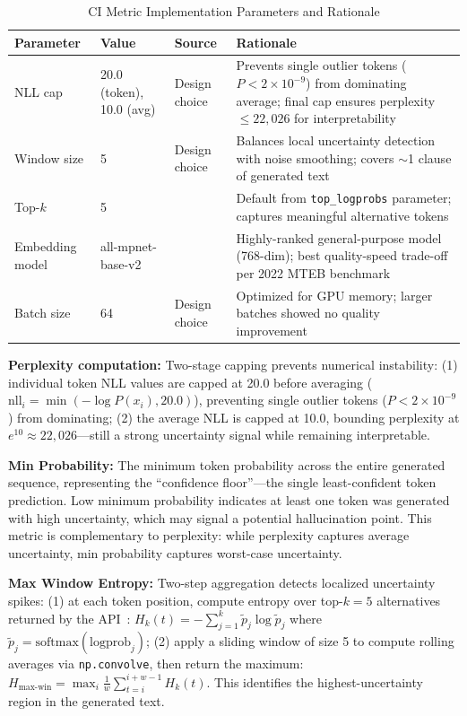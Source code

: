 \begin{table}[H]
\centering
\caption{CI Metric Implementation Parameters and Rationale}
\label{tab:ci_params}
\footnotesize
\begin{tabularx}{\textwidth}{@{}l l l X@{}}
\toprule
\textbf{Parameter} & \textbf{Value} & \textbf{Source} & \textbf{Rationale} \\
\midrule
NLL cap & 20.0 (token), 10.0 (avg) & Design choice & Prevents single outlier tokens ($P < 2 \times 10^{-9}$) from dominating average; final cap ensures perplexity $\leq 22{,}026$ for interpretability \\
Window size & 5 & Design choice & Balances local uncertainty detection with noise smoothing; covers $\sim$1 clause of generated text \\
Top-$k$ & 5 & \cite{openai2024api} & Default from \texttt{top\_logprobs} parameter; captures meaningful alternative tokens \\
Embedding model & all-mpnet-base-v2 & \cite{muennighoff2023mteb} & Highly-ranked general-purpose model (768-dim); best quality-speed trade-off per 2022 MTEB benchmark \\
Batch size & 64 & Design choice & Optimized for GPU memory; larger batches showed no quality improvement \\
\bottomrule
\end{tabularx}
\end{table}

\textbf{Perplexity computation:} Two-stage capping prevents numerical instability: (1) individual token NLL values are capped at 20.0 before averaging ($\text{nll}_i = \min(-\log P(x_i), 20.0)$), preventing single outlier tokens ($P < 2 \times 10^{-9}$) from dominating; (2) the average NLL is capped at 10.0, bounding perplexity at $e^{10} \approx 22{,}026$---still a strong uncertainty signal while remaining interpretable.

\textbf{Min Probability:} The minimum token probability across the entire generated sequence, representing the ``confidence floor''---the single least-confident token prediction. Low minimum probability indicates at least one token was generated with high uncertainty, which may signal a potential hallucination point. This metric is complementary to perplexity: while perplexity captures average uncertainty, min probability captures worst-case uncertainty.

\textbf{Max Window Entropy:} Two-step aggregation detects localized uncertainty spikes: (1) at each token position, compute entropy over top-$k=5$ alternatives returned by the API~\cite{openai2024api}: $H_k(t) = -\sum_{j=1}^{k} \tilde{p}_j \log \tilde{p}_j$ where $\tilde{p}_j = \text{softmax}(\text{logprob}_j)$; (2) apply a sliding window of size 5 to compute rolling averages via \texttt{np.convolve}, then return the maximum: $H_{\text{max-win}} = \max_i \frac{1}{w}\sum_{t=i}^{i+w-1} H_k(t)$. This identifies the highest-uncertainty region in the generated text.

